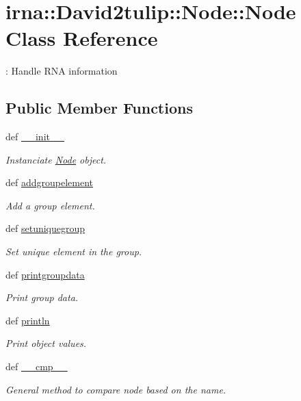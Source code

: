 \hypertarget{classirna_1_1David2tulip_1_1Node_1_1Node}{
\section{irna\-:\-:\-David2tulip\-:\-:\-Node\-:\-:\-Node \-Class \-Reference}
\label{classirna_1_1David2tulip_1_1Node_1_1Node}
}


\-: \-Handle \-R\-N\-A information  


\subsection*{\-Public \-Member \-Functions}
\begin{DoxyCompactItemize}
\item 
def \hyperlink{classirna_1_1David2tulip_1_1Node_1_1Node_a2df73f5af9b0a1c3b9cf97094feb3a33}{\-\_\-\-\_\-init\-\_\-\-\_\-}
\begin{DoxyCompactList}\small\item\em \-Instanciate \hyperlink{classirna_1_1David2tulip_1_1Node_1_1Node}{\-Node} object. \end{DoxyCompactList}\item 
def \hyperlink{classirna_1_1David2tulip_1_1Node_1_1Node_a625f38b13873e94a37434041a200ae5b}{addgroupelement}
\begin{DoxyCompactList}\small\item\em \-Add a group element. \end{DoxyCompactList}\item 
def \hyperlink{classirna_1_1David2tulip_1_1Node_1_1Node_af87a6b8f774558406d1ccb8b215e226c}{setuniquegroup}
\begin{DoxyCompactList}\small\item\em \-Set unique element in the group. \end{DoxyCompactList}\item 
def \hyperlink{classirna_1_1David2tulip_1_1Node_1_1Node_a4f7aa9ba379f6ee9d06b23710c9dbea3}{printgroupdata}
\begin{DoxyCompactList}\small\item\em \-Print group data. \end{DoxyCompactList}\item 
def \hyperlink{classirna_1_1David2tulip_1_1Node_1_1Node_aceb6907a89b89b50aecbe9372d29b256}{println}
\begin{DoxyCompactList}\small\item\em \-Print object values. \end{DoxyCompactList}\item 
def \hyperlink{classirna_1_1David2tulip_1_1Node_1_1Node_a8349c2e518f9fc4e80fbc52ed28833da}{\-\_\-\-\_\-cmp\-\_\-\-\_\-}
\begin{DoxyCompactList}\small\item\em \-General method to compare node based on the name. \end{DoxyCompactList}\end{DoxyCompactItemize}
